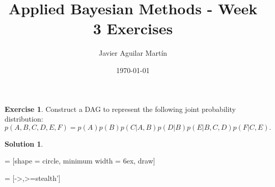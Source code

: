 \documentclass{article}
\theoremstyle{plain}
\theoremstyle{definition}
\newtheorem{exercise}{Exercise}
\newtheorem*{sol*}{Solution}
\begin{document}
\title{Applied Bayesian Methods - Week 3 Exercises}
\author{Javier Aguilar Martín}
\date{\today}
\maketitle
\begin{exercise}
Construct a DAG to represent the following joint probability distribution:
\[p(A,B,C,D,E, F) = p(A)p(B)p(C|A,B)p(D|B)p(E|B,C,D)p(F|C,E).\]
\end{exercise}
\begin{sol*}\

  = [shape            = circle,
                               minimum width    = 6ex,%
                               draw]

       = [->,>=stealth']      

\end{sol*}
\end{document}
